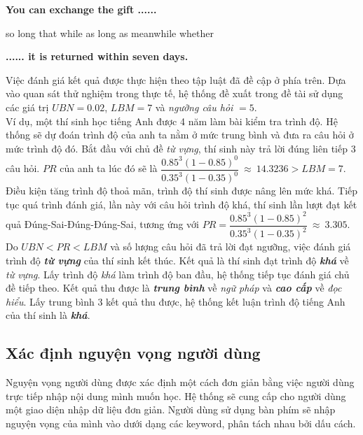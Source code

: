 \textbf{You can exchange the gift ......}\\
  \begin{choices}
    \choice so long that
    \choice while
    \choice as long as
    \choice meanwhile
    \choice whether
  \end{choices}
\begin{flushright}{\textbf{...... it is returned within seven days.}}\\	
\end{flushright}

 Việc đánh giá kết quả được thực hiện theo tập luật đã đề cập ở phía trên. Dựa vào quan sát thử nghiệm trong thực tế, hệ thống đề xuất trong đề tài sử dụng các giá trị $UBN = 0.02$, $LBM = 7$ và \textit{ngưỡng câu hỏi} $= 5$.\\
 
 Ví dụ, một thí sinh học tiếng Anh được 4 năm làm bài kiểm tra trình độ. Hệ thống sẽ dự đoán trình độ của anh ta nằm ở mức trung bình và đưa ra câu hỏi ở mức trình độ đó. Bắt đầu với chủ đề \textit{từ vựng}, thí sinh này trả lời đúng liên tiếp 3 câu hỏi. $PR$ của anh ta lúc đó sẽ là $\dfrac{0.85^3(1-0.85)^0}{0.35^3(1-0.35)^0}\: \approx \: 14.3236 > LBM = 7$. Điều kiện tăng trình độ thoả mãn, trình độ thí sinh được nâng lên mức khá. Tiếp tục quá trình đánh giá, lần này với câu hỏi trình độ khá, thí sinh lần lượt đạt kết quả Đúng-Sai-Đúng-Đúng-Sai, tương ứng với $PR = \dfrac{0.85^3(1-0.85)^2}{0.35^3(1-0.35)^2}\: \approx \: 3.305 $. Do $ UBN < PR < LBM $ và số lượng câu hỏi đã trả lời đạt ngưỡng, việc đánh giá trình độ \textit\textbf{từ vựng} của thí sinh kết thúc. Kết quả là thí sinh đạt trình độ \textbf{\textit{khá}} về \textit{từ vựng}. Lấy trình độ \textit{khá} làm trình độ ban đầu, hệ thống tiếp tục đánh giá chủ đề tiếp theo. Kết quả thu được là \textbf{\textit{trung bình}} về \textit{ngữ pháp} và \textbf{\textit{cao cấp}} về \textit{đọc hiểu}. Lấy trung bình 3 kết quả thu được, hệ thống kết luận trình độ tiếng Anh của thí sinh là \textbf{\textit{khá}}. 
 
 \subsection{Xác định nguyện vọng người dùng}
 
 Nguyện vọng người dùng được xác định một cách đơn giản bằng việc người dùng trực tiếp nhập nội dung mình muốn học. Hệ thống sẽ cung cấp cho người dùng một giao diện nhập dữ liệu đơn giản. Người dùng sử dụng bàn phím sẽ nhập nguyện vọng của mình vào dưới dạng các keyword, phân tách nhau bởi dấu cách. \\
 
